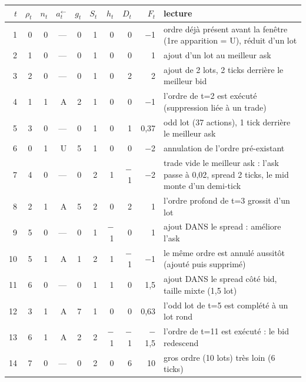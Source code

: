 \begin{tabular}{rrrrrrrrrl}
\toprule
$t$ & $\rho_t$ & $n_t$ & $a^{\leftarrow}_t$ & $g_t$ & $S_t$ & $h_t$ & $D_t$ & $F_t$ & lecture\\
\midrule
1 & 0 & 0 & — & 0 & 1 & 0 & 0 & $-$1 & \parbox[t]{6.2cm}{\raggedright\scriptsize ordre déjà présent avant la fenêtre (1re apparition = U), réduit d'un lot}\\
2 & 1 & 0 & — & 0 & 1 & 0 & 0 & 1 & \parbox[t]{6.2cm}{\raggedright\scriptsize ajout d'un lot au meilleur ask}\\
3 & 2 & 0 & — & 0 & 1 & 0 & 2 & 2 & \parbox[t]{6.2cm}{\raggedright\scriptsize ajout de 2 lots, 2 ticks derrière le meilleur bid}\\
4 & 1 & 1 & A & 2 & 1 & 0 & 0 & $-$1 & \parbox[t]{6.2cm}{\raggedright\scriptsize l'ordre de t=2 est exécuté (suppression liée à un trade)}\\
5 & 3 & 0 & — & 0 & 1 & 0 & 1 & 0{,}37 & \parbox[t]{6.2cm}{\raggedright\scriptsize odd lot (37 actions), 1 tick derrière le meilleur ask}\\
6 & 0 & 1 & U & 5 & 1 & 0 & 0 & $-$2 & \parbox[t]{6.2cm}{\raggedright\scriptsize annulation de l'ordre pré-existant}\\
7 & 4 & 0 & — & 0 & 2 & 1 & $-$1 & $-$2 & \parbox[t]{6.2cm}{\raggedright\scriptsize trade vide le meilleur ask : l'ask passe à 0,02, spread 2 ticks, le mid monte d'un demi-tick}\\
8 & 2 & 1 & A & 5 & 2 & 0 & 2 & 1 & \parbox[t]{6.2cm}{\raggedright\scriptsize l'ordre profond de t=3 grossit d'un lot}\\
9 & 5 & 0 & — & 0 & 1 & $-$1 & 0 & 1 & \parbox[t]{6.2cm}{\raggedright\scriptsize ajout DANS le spread : améliore l'ask}\\
10 & 5 & 1 & A & 1 & 2 & 1 & $-$1 & $-$1 & \parbox[t]{6.2cm}{\raggedright\scriptsize le même ordre est annulé aussitôt (ajouté puis supprimé)}\\
11 & 6 & 0 & — & 0 & 1 & 1 & 0 & 1{,}5 & \parbox[t]{6.2cm}{\raggedright\scriptsize ajout DANS le spread côté bid, taille mixte (1,5 lot)}\\
12 & 3 & 1 & A & 7 & 1 & 0 & 0 & 0{,}63 & \parbox[t]{6.2cm}{\raggedright\scriptsize l'odd lot de t=5 est complété à un lot rond}\\
13 & 6 & 1 & A & 2 & 2 & $-$1 & $-$1 & $-$1{,}5 & \parbox[t]{6.2cm}{\raggedright\scriptsize l'ordre de t=11 est exécuté : le bid redescend}\\
14 & 7 & 0 & — & 0 & 2 & 0 & 6 & 10 & \parbox[t]{6.2cm}{\raggedright\scriptsize gros ordre (10 lots) très loin (6 ticks)}\\

\end{tabular}
